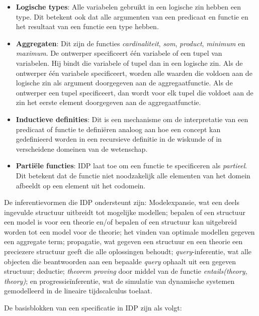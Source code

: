 \begin{itemize}
	\item \textbf{Logische types}: Alle variabelen gebruikt in een logische zin hebben een type. Dit betekent ook dat alle argumenten van een predicaat en functie en het resultaat van een functie een type hebben.
	\item \textbf{Aggregaten}: Dit zijn de functies \textit{cardinaliteit}, \textit{som}, \textit{product}, \textit{minimum} en \textit{maximum}. De ontwerper specificeert \'e\'en variabele of een tupel van variabelen. Hij bindt die variabele of tupel dan in een logische zin. Als de ontwerper \'e\'en variabele specificeert, worden alle waarden die voldoen aan de logische zin als argument doorgegeven aan de aggregaatfunctie. Als de ontwerper een tupel specificeert, dan wordt voor elk tupel die voldoet aan de zin het eerste element doorgegeven aan de aggregaatfunctie.
	\item \textbf{Inductieve definities}: Dit is een mechanisme om de interpretatie van een predicaat of functie te defini\"eren analoog aan hoe een concept kan gedefinieerd worden in een recursieve definitie in de wiskunde of in verscheidene domeinen van de wetenschap.
	\item \textbf{Parti\"ele functies}: IDP laat toe om een functie te specificeren als \textit{partieel}. Dit betekent dat de functie niet noodzakelijk alle elementen van het domein afbeeldt op een element uit het codomein.
\end{itemize}

De inferentievormen die IDP ondersteunt zijn: Modelexpansie, wat een deels ingevulde structuur uitbreidt tot mogelijke modellen; bepalen of een structuur een model is voor een theorie en/of bepalen of een structuur kan uitgebreid worden tot een model voor de theorie; het vinden van optimale modellen gegeven een aggregate term; propagatie, wat gegeven een structuur en een theorie een preciezere structuur geeft die alle oplossingen behoudt; \textit{query}-inferentie, wat alle objecten die beantwoorden aan een bepaalde \textit{query} ophaalt uit een gegeven structuur; deductie; \textit{theorem proving} door middel van de functie \textit{entails(theory, theory)}; en progressie\"inferentie, wat de simulatie van dynamische systemen gemodelleerd in de lineaire tijdscalculus\cite{BogaertsBart2014Sdsu} toelaat.

De basisblokken van een specificatie in IDP zijn als volgt:


